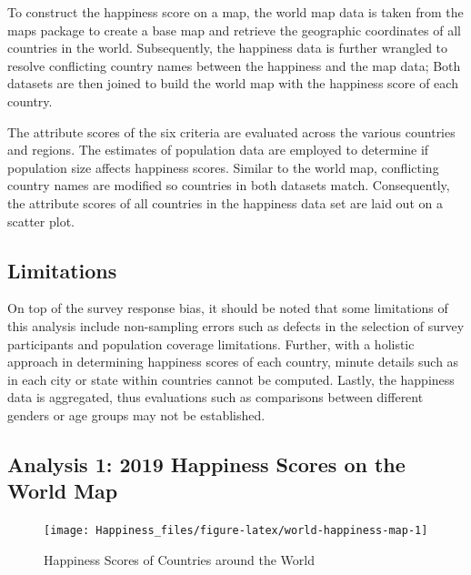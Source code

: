 \documentclass[11pt,a4paper,]{article}
\begin{document}
To construct the happiness score on a map, the world map data is taken from the maps package \autocite{maps} to create a base map and retrieve the geographic coordinates of all countries in the world. Subsequently, the happiness data is further wrangled to resolve conflicting country names between the happiness and the map data; Both datasets are then joined to build the world map with the happiness score of each country.

The attribute scores of the six criteria are evaluated across the various countries and regions. The estimates of population data are employed \autocite{wbstats} to determine if population size affects happiness scores. Similar to the world map, conflicting country names are modified so countries in both datasets match. Consequently, the attribute scores of all countries in the happiness data set are laid out on a scatter plot.

\clearpage

\hypertarget{limitations}{%
\subsection{Limitations}\label{limitations}}

On top of the survey response bias, it should be noted that some limitations of this analysis include non-sampling errors such as defects in the selection of survey participants and population coverage limitations. Further, with a holistic approach in determining happiness scores of each country, minute details such as in each city or state within countries cannot be computed. Lastly, the happiness data is aggregated, thus evaluations such as comparisons between different genders or age groups may not be established.

\clearpage

\hypertarget{analysis-1-2019-happiness-scores-on-the-world-map}{%
\subsection{Analysis 1: 2019 Happiness Scores on the World Map}\label{analysis-1-2019-happiness-scores-on-the-world-map}}

\begin{figure}

{\centering \texttt{[image: Happiness\_files/figure-latex/world-happiness-map-1]} 

}

\caption{Happiness Scores of Countries around the World}\label{fig:world-happiness-map}
\end{figure}
\end{document}
